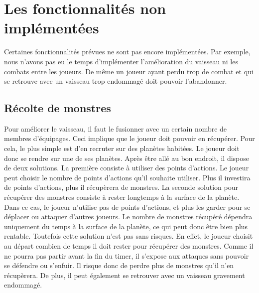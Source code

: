 \documentclass[a4paper,11pt]{report}
\begin{document}
  \section{Les fonctionnalités non implémentées}
    Certaines fonctionnalités prévues ne sont pas encore implémentées. 
    Par exemple, nous n'avons pas eu le temps d'implémenter l'amélioration du vaisseau ni les combats entre les joueurs.
    De même un joueur ayant perdu trop de combat et qui se retrouve avec un vaisseau trop endommagé doit pouvoir l'abandonner.
    
    \subsection{Récolte de monstres}
      Pour améliorer le vaisseau, il faut le fusionner avec un certain nombre de membres d'équipages. Ceci implique que le joueur doit pouvoir en récupérer.
      Pour cela, le plus simple est d'en recruter sur des planètes habitées. Le joueur doit donc se rendre sur une de ses planètes.
      Après être allé au bon endroit, il dispose de deux solutions.
      La première consiste à utiliser des points d'actions. Le joueur peut choisir le nombre de points d'actions qu'il souhaite utiliser.
      Plus il investira de points d'actions, plus il récupèrera de monstres.
      \newline
      La seconde solution pour récupérer des monstres consiste à rester longtemps à la surface de la planète. Dans ce cas, le joueur n'utilise pas de points d'actions, et plus les garder pour se déplacer ou attaquer d'autres joueurs.
      Le nombre de monstres récupéré dépendra uniquement du temps à la surface de la planète, ce qui peut donc être bien plus rentable.
      Toutefois cette solution n'est pas sans risques. En effet, le joueur choisit au départ combien de temps il doit rester pour récupérer des monstres.
      Comme il ne pourra pas partir avant la fin du timer, il s'expose aux attaques sans pouvoir se défendre ou s'enfuir. Il risque donc de perdre plus de monstres qu'il n'en récupèrera.
      De plus, il peut également se retrouver avec un vaisseau gravement endommagé.
    
\end{document}
